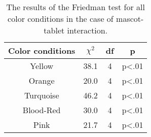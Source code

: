 \begin{table}[hbt!]
    \renewcommand{\arraystretch}{1}
    \begin{center}
        \begin{tabular}{|c|c|c|c|}
            \hline
            \textbf{Color conditions} & \textbf{$\chi^2$} & \textbf{df} & \textbf{p} \\
            \hline
            Yellow &38.1 &4 &p<.01 \\
            \hline
            Orange &20.0 &4 &p<.01 \\
            \hline
            Turquoise &46.2 &4 &p<.01 \\
            \hline
            Blood-Red &30.0 &4 &p<.01 \\
            \hline
            Pink &21.7 &4 &p<.01 \\
            \hline
        \end{tabular}
        \caption{The results of the Friedman test for all color conditions in the case of mascot-tablet interaction.}
        \label{table:friedmanMT2}
    \end{center}
\end{table}

